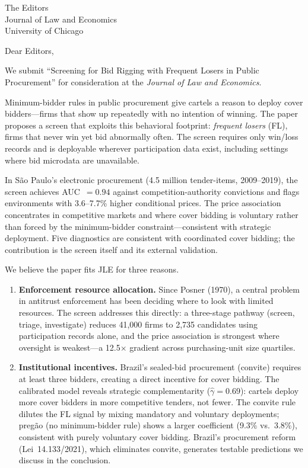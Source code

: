 \documentclass[12pt]{letter}
\date{April 2026}
\begin{document}
\begin{letter}{The Editors\\Journal of Law and Economics\\University of Chicago}

\opening{Dear Editors,}

We submit ``Screening for Bid Rigging with Frequent Losers in Public Procurement'' for consideration at the \textit{Journal of Law and Economics}.

Minimum-bidder rules in public procurement give cartels a reason to deploy cover bidders---firms that show up repeatedly with no intention of winning. The paper proposes a screen that exploits this behavioral footprint: \textit{frequent losers} (FL), firms that never win yet bid abnormally often. The screen requires only win/loss records and is deployable wherever participation data exist, including settings where bid microdata are unavailable.

In S\~ao Paulo's electronic procurement (4.5 million tender-items, 2009--2019), the screen achieves AUC~$= 0.94$ against competition-authority convictions and flags environments with 3.6--7.7\% higher conditional prices. The price association concentrates in competitive markets and where cover bidding is voluntary rather than forced by the minimum-bidder constraint---consistent with strategic deployment. Five diagnostics are consistent with coordinated cover bidding; the contribution is the screen itself and its external validation.

We believe the paper fits JLE for three reasons.

\begin{enumerate}
\item \textbf{Enforcement resource allocation.} Since Posner (1970), a central problem in antitrust enforcement has been deciding where to look with limited resources. The screen addresses this directly: a three-stage pathway (screen, triage, investigate) reduces 41,000 firms to 2,735 candidates using participation records alone, and the price association is strongest where oversight is weakest---a 12.5$\times$ gradient across purchasing-unit size quartiles.

\item \textbf{Institutional incentives.} Brazil's sealed-bid procurement (convite) requires at least three bidders, creating a direct incentive for cover bidding. The calibrated model reveals strategic complementarity ($\hat{\gamma} = 0.69$): cartels deploy more cover bidders in more competitive tenders, not fewer. The convite rule dilutes the FL signal by mixing mandatory and voluntary deployments; preg\~ao (no minimum-bidder rule) shows a larger coefficient (9.3\% vs.\ 3.8\%), consistent with purely voluntary cover bidding. Brazil's procurement reform (Lei~14.133/2021), which eliminates convite, generates testable predictions we discuss in the conclusion.


\end{enumerate}
\end{letter}
\end{document}
